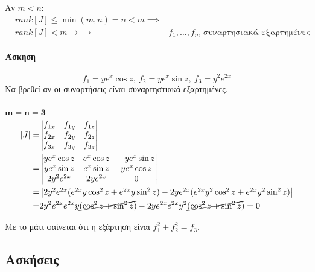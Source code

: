 \documentclass[11pt,a4paper,titlepage,draft]{article}
\begin{document}
Αν \(m<n\):
\begin{align*}
&rank[J] \leq \min(m,n) = n <m \implies\\&
rank[J]<m \rightarrow \rightarrow&f_1,\dots,f_m \text{ συναρτησιακά εξαρτημένες}
\end{align*}

\paragraph{Άσκηση}
\[f_1=ye^x\cos z,\ f_2=ye^x\sin z,\ f_3=y^2e^{2x}\]
Να βρεθεί αν οι συναρτήσεις είναι συναρτηστιακά εξαρτημένες.

\subparagraph{}
\(\mathbf{m=n=3}\)
\begin{align*}
|J|=&\left|
\begin{matrix}
f_{1x}&f_{1y}&f_{1z}\\
f_{2x}&f_{2y}&f_{2z}\\
f_{3x}&f_{3y}&f_{3z}
\end{matrix}
\right|\\
=&\left|
\begin{matrix}
ye^x\cos z&e^x\cos z&-ye^x\sin z\\
ye^x\sin z&e^x\sin z & ye^x\cos z\\
2y^2e^{2x}&2ye^{2x}&0
\end{matrix}
\right|\\
=&\left|
\begin{matrix}
2y^2e^{2x}(e^{2x}y\cos^2 z +e^{2x}y\sin^2z)
-2ye^{2x}(e^{2x}y^2\cos^2z+e^{2x}y^2\sin^2 z)
\end{matrix}
\right|
\\=&
2y^2e^{2x}e^{2x}y\cancel{(\cos^2 z+\sin^2 z)}-2ye^{2x}e^{2x}y^2\cancel{(\cos^2 z + \sin^2 z)}=0
\end{align*}

Με το μάτι φαίνεται ότι η εξάρτηση είναι \(f_1^2+f_2^2=f_3\).


\subsection{Ασκήσεις}
\end{document}
